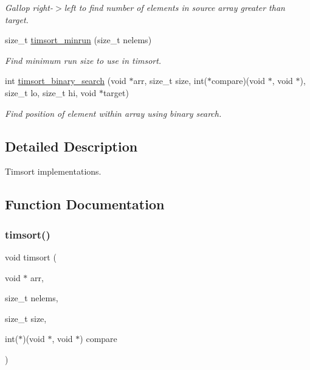 \begin{DoxyCompactItemize}
\begin{DoxyCompactList}\small\item\em Gallop right-\/$>$left to find number of elements in source array greater than target. \end{DoxyCompactList}\item 
size\+\_\+t \hyperlink{group__Timsort_ga7d1b40d5d91736aa4b5362896cdc68f3}{timsort\+\_\+minrun} (size\+\_\+t nelems)
\begin{DoxyCompactList}\small\item\em Find minimum run size to use in timsort. \end{DoxyCompactList}\item 
int \hyperlink{group__Timsort_gac83afa31d70a068091adc4a017b08602}{timsort\+\_\+binary\+\_\+search} (void $\ast$arr, size\+\_\+t size, int($\ast$compare)(void $\ast$, void $\ast$), size\+\_\+t lo, size\+\_\+t hi, void $\ast$target)
\begin{DoxyCompactList}\small\item\em Find position of element within array using binary search. \end{DoxyCompactList}\end{DoxyCompactItemize}


\subsection{Detailed Description}
Timsort implementations. 



\subsection{Function Documentation}
\mbox{\label{group__Timsort_gae421187852c6c109058362a81539de0f}} 
\subsubsection{\texorpdfstring{timsort()}{timsort()}}
{\footnotesize\ttfamily void timsort (\begin{DoxyParamCaption}\item[{void $\ast$}]{arr,  }\item[{size\+\_\+t}]{nelems,  }\item[{size\+\_\+t}]{size,  }\item[{int($\ast$)(void $\ast$, void $\ast$)}]{compare }\end{DoxyParamCaption})}



